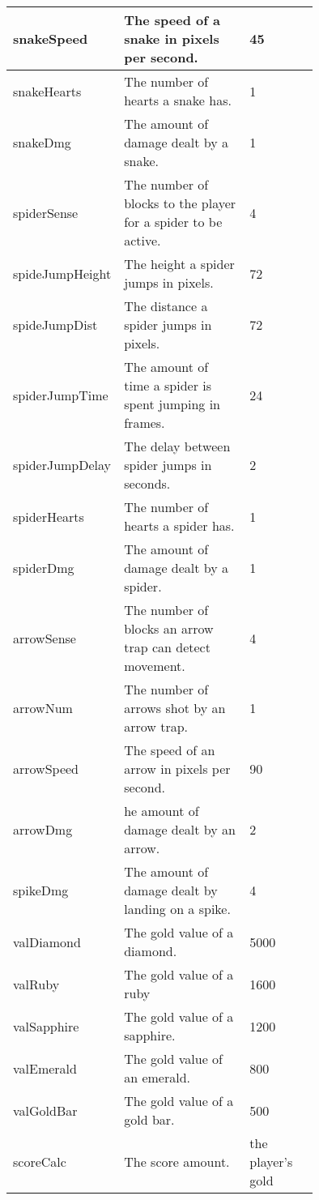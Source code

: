 \documentclass[12pt, titlepage]{article}
\begin{document}
\begin{longtable}{|l|p{0.5\linewidth}|p{0.25\linewidth}|}
snakeSpeed & The speed of a snake in pixels per second. & 45\\
\hline
snakeHearts & The number of hearts a snake has. & 1\\
\hline
snakeDmg & The amount of damage dealt by a snake. & 1\\
\hline

spiderSense & The number of blocks to the player for a spider to be active. & 4\\
\hline
spideJumpHeight & The height a spider jumps in pixels. & 72\\
\hline
spideJumpDist & The distance a spider jumps in pixels. & 72\\
\hline
spiderJumpTime & The amount of time a spider is spent jumping in frames. & 24\\
\hline
spiderJumpDelay & The delay between spider jumps in seconds. & 2\\
\hline
spiderHearts & The number of hearts a spider has. & 1\\
\hline
spiderDmg & The amount of damage dealt by a spider. & 1\\
\hline

arrowSense & The number of blocks an arrow trap can detect movement. & 4\\
\hline
arrowNum & The number of arrows shot by an arrow trap. & 1\\
\hline
arrowSpeed & The speed of an arrow in pixels per second. & 90\\
\hline
arrowDmg & he amount of damage dealt by an arrow. & 2\\
\hline
spikeDmg & The amount of damage dealt by landing on a spike. & 4\\
\hline


valDiamond & The gold value of a diamond. & 5000\\
\hline
valRuby & The gold value of a ruby & 1600\\
\hline
valSapphire & The gold value of a sapphire. & 1200\\
\hline
valEmerald & The gold value of an emerald. & 800\\
\hline
valGoldBar & The gold value of a gold bar. & 500\\
\hline
scoreCalc & The score amount. & the player's gold\\
\hline
\end{longtable}
\end{document}
